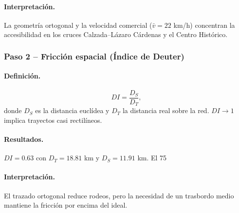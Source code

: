 \documentclass[11pt]{article}
\begin{document}
		\paragraph{Interpretación.} La geometría ortogonal y la velocidad comercial ($\bar v=22$ km/h) concentran la accesibilidad en los cruces Calzada–Lázaro Cárdenas y el Centro Histórico.

		\subsubsection*{Paso 2 – Fricción espacial (Índice de Deuter)}
		\paragraph{Definición.}
		\[
		DI=\frac{D_S}{D_T},
		\]
		donde $D_S$ es la distancia euclídea y $D_T$ la distancia real sobre la red. $DI\!\to\!1$ implica trayectos casi rectilíneos.

		\paragraph{Resultados.} $DI=0.63$ con $D_T=18.81$ km y $D_S=11.91$ km. El 75 %

		\paragraph{Interpretación.} El trazado ortogonal reduce rodeos, pero la necesidad de un trasbordo medio mantiene la fricción por encima del ideal.
\end{document}
